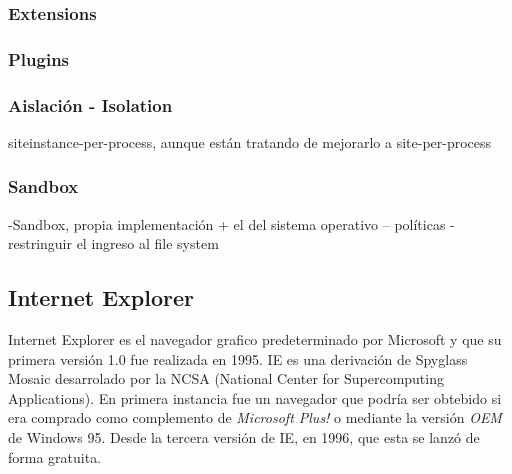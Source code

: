 

        \subsubsection{Extensions}

        \subsubsection{Plugins}

        \subsubsection{Aislación - Isolation}
            siteinstance-per-process, aunque están tratando de mejorarlo a site-per-process \cite{GoogleChromeIsolation}
        \subsubsection{Sandbox}
            -Sandbox, propia implementación + el del sistema operativo – políticas
            -restringuir el ingreso al file system



    \subsection{Internet Explorer}
    \label{chap3:IE}
    Internet Explorer es el navegador grafico predeterminado por Microsoft y que su primera versión 1.0 fue realizada en 1995. IE es una derivación de Spyglass Mosaic desarrolado por la NCSA (National Center for Supercomputing Applications). En primera instancia fue un navegador que podría ser obtebido si era comprado como complemento de \textit{Microsoft Plus!} o mediante la versión \textit{OEM} de Windows 95. Desde la tercera versión de IE, en 1996, que esta se lanzó de forma gratuita.
            
